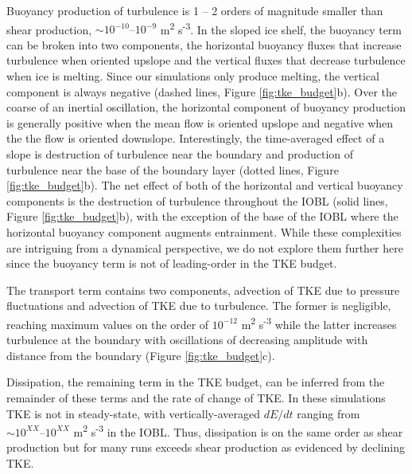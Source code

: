\documentclass[draft]{agujournal2019}
\begin{document}
Buoyancy production of turbulence is 1 -- 2 orders of magnitude smaller than shear production, $\sim 10^{-10} \textrm{--} 10^{-9}$ m\textsuperscript{2} s\textsuperscript{-3}. In the sloped ice shelf, the buoyancy term can be broken into two components, the horizontal buoyancy fluxes that increase turbulence when oriented upslope and the vertical fluxes that decrease turbulence when ice is melting. Since our simulations only produce melting, the vertical component is always negative (dashed lines, Figure \ref{fig:tke_budget}b). Over the coarse of an inertial oscillation, the horizontal component of buoyancy production is generally positive when the mean flow is oriented upslope and negative when the the flow is oriented downslope. Interestingly, the time-averaged effect of a slope is destruction of turbulence near the boundary and production of turbulence near the base of the boundary layer (dotted lines, Figure \ref{fig:tke_budget}b). The net effect of both of the horizontal and vertical buoyancy components is the destruction of turbulence throughout the IOBL (solid lines, Figure \ref{fig:tke_budget}b), with the exception of the base of the IOBL where the horizontal buoyancy component augments entrainment. While these complexities are intriguing from a dynamical perspective, we do not explore them further here since the buoyancy term is not of leading-order in the TKE budget.

The transport term contains two components, advection of TKE due to pressure fluctuations and advection of TKE due to turbulence. The former is negligible, reaching maximum values on the order of $10^{-12}$ m\textsuperscript{2} s\textsuperscript{-3} while the latter increases turbulence at the boundary with oscillations of decreasing amplitude with distance from the boundary (Figure \ref{fig:tke_budget}c). 

Dissipation, the remaining term in the TKE budget, can be inferred from the remainder of these terms and the rate of change of TKE. In these simulations TKE is not in steady-state, with vertically-averaged $dE/dt$ ranging from $\sim 10^{XX} \textrm{--} 10^{XX}$ m\textsuperscript{2} s\textsuperscript{-3} in the IOBL. Thus, dissipation is on the same order as shear production but for many runs exceeds shear production as evidenced by declining TKE. 
\end{document}
